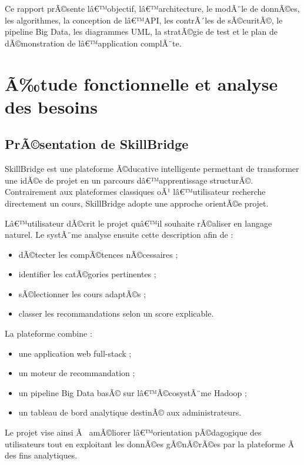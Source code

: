 ﻿\documentclass[12pt,a4paper]{report}
\begin{document}
Ce rapport prÃ©sente lâ€™objectif, lâ€™architecture, le modÃ¨le de donnÃ©es, les algorithmes, la conception de lâ€™API, les contrÃ´les de sÃ©curitÃ©, le pipeline Big Data, les diagrammes UML, la stratÃ©gie de test et le plan de dÃ©monstration de lâ€™application complÃ¨te.

\tableofcontents
\listoffigures
\listoftables
\newpage
{}

\chapter{Ã‰tude fonctionnelle et analyse des besoins}

\section{PrÃ©sentation de SkillBridge}

SkillBridge est une plateforme Ã©ducative intelligente permettant de transformer une idÃ©e de projet en un parcours dâ€™apprentissage structurÃ©. Contrairement aux plateformes classiques oÃ¹ lâ€™utilisateur recherche directement un cours, SkillBridge adopte une approche orientÃ©e projet.

Lâ€™utilisateur dÃ©crit le projet quâ€™il souhaite rÃ©aliser en langage naturel. Le systÃ¨me analyse ensuite cette description afin de :
\begin{itemize}
    \item dÃ©tecter les compÃ©tences nÃ©cessaires ;
    \item identifier les catÃ©gories pertinentes ;
    \item sÃ©lectionner les cours adaptÃ©s ;
    \item classer les recommandations selon un score explicable.
\end{itemize}

La plateforme combine :
\begin{itemize}
    \item une application web full-stack ;
    \item un moteur de recommandation ;
    \item un pipeline Big Data basÃ© sur lâ€™Ã©cosystÃ¨me Hadoop ;
    \item un tableau de bord analytique destinÃ© aux administrateurs.
\end{itemize}

Le projet vise ainsi Ã  amÃ©liorer lâ€™orientation pÃ©dagogique des utilisateurs tout en exploitant les donnÃ©es gÃ©nÃ©rÃ©es par la plateforme Ã  des fins analytiques.
\end{document}
